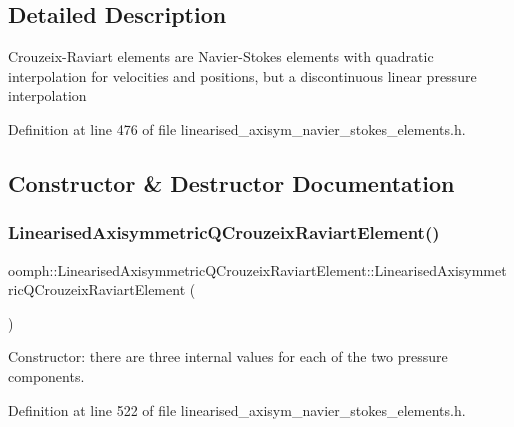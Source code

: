 \subsection{Detailed Description}
Crouzeix-\/\+Raviart elements are Navier-\/\+Stokes elements with quadratic interpolation for velocities and positions, but a discontinuous linear pressure interpolation 

Definition at line 476 of file linearised\+\_\+axisym\+\_\+navier\+\_\+stokes\+\_\+elements.\+h.



\subsection{Constructor \& Destructor Documentation}
\mbox{\label{classoomph_1_1LinearisedAxisymmetricQCrouzeixRaviartElement_a7661fbccf605f3affb81249aca99c19f}} 
\subsubsection{\texorpdfstring{Linearised\+Axisymmetric\+Q\+Crouzeix\+Raviart\+Element()}{LinearisedAxisymmetricQCrouzeixRaviartElement()}}
{\footnotesize\ttfamily oomph\+::\+Linearised\+Axisymmetric\+Q\+Crouzeix\+Raviart\+Element\+::\+Linearised\+Axisymmetric\+Q\+Crouzeix\+Raviart\+Element (\begin{DoxyParamCaption}{ }\end{DoxyParamCaption})\hspace{0.3cm}{\ttfamily [inline]}}



Constructor\+: there are three internal values for each of the two pressure components. 



Definition at line 522 of file linearised\+\_\+axisym\+\_\+navier\+\_\+stokes\+\_\+elements.\+h.



